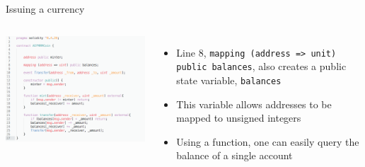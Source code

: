 \documentclass[10pt]{beamer}
\begin{document}
\begin{frame}{Issuing a currency}
	\begin{columns}
	    \includegraphics  [scale=0.3]{Images/contract_new}

	    \begin{itemize}
		    \item Line 8, \texttt{mapping (address => unit) public balances}, also creates a public state variable, \texttt{balances}
			\item This variable allows addresses to be mapped to unsigned integers
			\item Using a function, one can easily query the balance of a single account
	    \end{itemize}
	\end{columns}
\end{frame}

\end{document}

